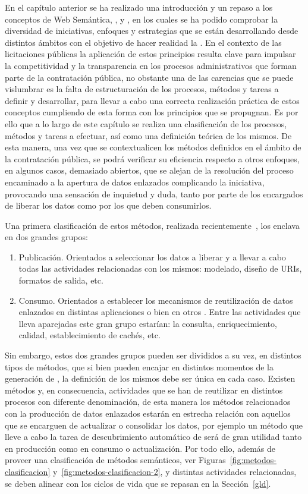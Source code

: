 En el capítulo anterior se ha realizado una introducción y un repaso a los conceptos
de  Web Semántica, \opendata, \linkeddata y \lod, en los cuales se ha podido comprobar
la diversidad de iniciativas, enfoques y estrategias que se están desarrollando desde distintos ámbitos 
con el objetivo de hacer realidad la \wod. En el contexto
de las licitaciones públicas la aplicación de estos principios resulta clave para impulsar
la competitividad y la transparencia en los procesos administrativos que forman parte
de la contratación pública, no obstante una de las carencias que se puede vislumbrar
es la falta de estructuración de los procesos, métodos y tareas a definir
y desarrollar, para llevar a cabo una correcta realización práctica de estos conceptos
cumpliendo de esta forma con los principios que se propugnan. Es por ello que a lo largo de este capítulo se realiza una clasificación de los procesos, métodos y tareas
a efectuar, así como una definición teórica de los mismos. De esta manera,
una vez que se contextualicen los métodos definidos en el ámbito de la contratación pública, se podrá verificar su eficiencia respecto
a otros enfoques, en algunos casos, demasiado abiertos, que se alejan de la resolución del proceso 
encaminado a la apertura de datos enlazados complicando la iniciativa, provocando una sensación
de inquietud y duda, tanto por parte de los encargados de liberar los datos como 
por los que deben consumirlos.

Una primera clasificación de estos métodos, realizada recientemente~\cite{cold}, los enclava en dos grandes grupos:
\begin{enumerate}
 \item Publicación. Orientados a seleccionar los datos a liberar y a llevar a cabo
todas las actividades relacionadas con los mismos: modelado, diseño de URIs, formatos
de salida, etc.
 \item Consumo. Orientados a establecer los mecanismos de reutilización de datos enlazados
en distintas aplicaciones o bien en otros \datasets. Entre las actividades que lleva aparejadas
este gran grupo estarían: la consulta, enriquecimiento, calidad, establecimiento de cachés, etc.
\end{enumerate}

Sin embargo, estos dos grandes grupos pueden ser divididos a su vez, en distintos tipos de métodos, que si bien
pueden encajar en distintos momentos de la generación de \linkeddata, la definición de los mismos debe ser única en cada caso. Existen
métodos y, en consecuencia, actividades que se han de reutilizar en distintos procesos con diferente denominación, de esta manera 
los métodos relacionados con la producción de datos enlazados estarán en estrecha relación
con aquellos que se encarguen de actualizar o consolidar los datos, por ejemplo un método que lleve
a cabo la tarea de descubrimiento automático de \datasets será de gran utilidad tanto en producción como en consumo o actualización. 
Por todo ello, además de proveer una clasificación de métodos semánticos, ver Figuras~\ref{fig:metodos-clasificacion} y~\ref{fig:metodos-clasificacion-2}, y distintas actividades 
relacionadas, se deben alinear con los ciclos de vida que se repasan en la Sección~\ref{gld}.


